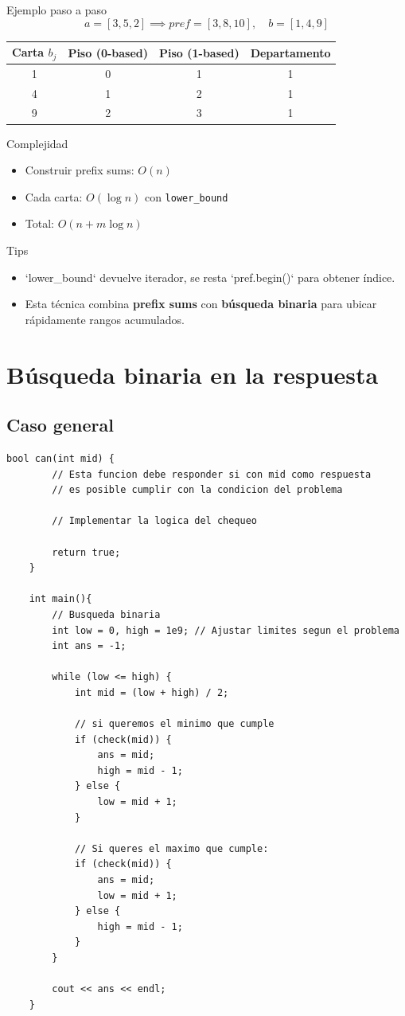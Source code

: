 Ejemplo paso a paso
\[
a = [3,5,2] \implies pref = [3,8,10], \quad b = [1,4,9]
\]

\begin{tabular}{c|c|c|c}
	Carta $b_j$ & Piso (0-based) & Piso (1-based) & Departamento \\
	\hline
	1 & 0 & 1 & 1 \\
	4 & 1 & 2 & 1 \\
	9 & 2 & 3 & 1
\end{tabular}

Complejidad
\begin{itemize}
	\item Construir prefix sums: $O(n)$
	\item Cada carta: $O(\log n)$ con \texttt{lower\_bound}
	\item Total: $O(n + m \log n)$
\end{itemize}

Tips
\begin{itemize}
	\item `lower\_bound` devuelve iterador, se resta `pref.begin()` para obtener índice.
	\item Esta técnica combina \textbf{prefix sums} con \textbf{búsqueda binaria} para ubicar rápidamente rangos acumulados.
\end{itemize}

\section{Búsqueda binaria en la respuesta}

\subsection{Caso general}
\begin{lstlisting}[style=cppstyle, caption={Busqueda binaria en la respuesta}]
	bool can(int mid) {
		// Esta funcion debe responder si con mid como respuesta
		// es posible cumplir con la condicion del problema
		
		// Implementar la logica del chequeo
		
		return true;
	}
	
	int main(){
		// Busqueda binaria
		int low = 0, high = 1e9; // Ajustar limites segun el problema
		int ans = -1;
		
		while (low <= high) {
			int mid = (low + high) / 2;
			
			// si queremos el minimo que cumple
			if (check(mid)) {
				ans = mid;        
				high = mid - 1;
			} else {
				low = mid + 1;
			}
			
			// Si queres el maximo que cumple:
			if (check(mid)) {
				ans = mid;
				low = mid + 1;
			} else {
				high = mid - 1;
			}
		}
		
		cout << ans << endl;
	}
	
\end{lstlisting}

